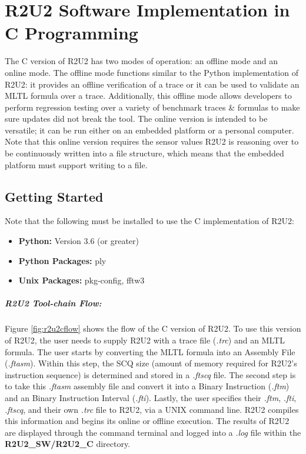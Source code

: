 \section{R2U2 Software Implementation in C Programming}
The C version of R2U2 has two modes of operation: an offline mode and an online mode. The offline mode functions similar to the Python implementation of R2U2: it provides an offline verification of a trace or it can be used to validate an MLTL formula over a trace. Additionally, this offline mode allows developers to perform regression testing over a variety of benchmark traces \& formulas to make sure updates did not break the tool. The online version is intended to be versatile; it can be run either on an embedded platform or a personal computer. Note that this online version requires the sensor values R2U2 is reasoning over to be continuously written into a file structure, which means that the embedded platform must support writing to a file.

\subsection{Getting Started}
Note that the following must be installed to use the C implementation of R2U2:
\begin{itemize}
	\item \textbf{Python:} Version 3.6 (or greater)
	\item \textbf{Python Packages:} ply
	\item \textbf{Unix Packages:} pkg-config, fftw3
\end{itemize}
\subparagraph{R2U2 Tool-chain Flow:} Figure \ref{fig:r2u2cflow} shows the flow of the C version of R2U2. To use this version of R2U2, the user needs to supply R2U2 with a trace file (\textit{.trc}) and an MLTL formula. The user starts by converting the MLTL formula into an Assembly File (\textit{.ftasm}). Within this step, the SCQ size (amount of memory required for R2U2's instruction sequence) is determined and stored in a \textit{.ftscq} file. The second step is to take this \textit{.ftasm} assembly file and convert it into a Binary Instruction (\textit{.ftm}) and an Binary Instruction Interval (\textit{.fti}). Lastly, the user specifies their \textit{.ftm}, \textit{.fti}, \textit{.ftscq}, and their own \textit{.trc} file to R2U2, via a UNIX command line. R2U2 compiles this information and begins its online or offline execution. The results of R2U2 are displayed through the command terminal and logged into a \textit{.log} file within the \textbf{R2U2\_SW/R2U2\_C} directory.

